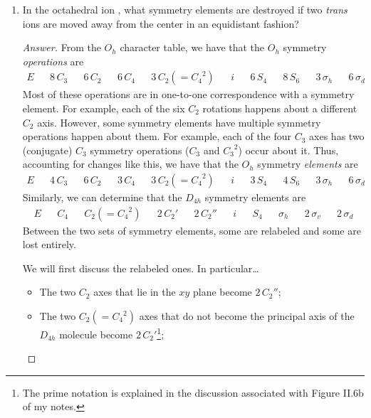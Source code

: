 \documentclass[../psets.tex]{subfiles}
\begin{document}
\begin{enumerate}[label={\Roman*)}]
\begin{enumerate}[label={\alph*)}]
\begin{proof}[Answer]
        \end{proof}
    \end{enumerate}
    \newpage
    \item In the octahedral ion , what symmetry elements are destroyed if two \emph{trans}  ions are moved away from the  center in an equidistant fashion?
    \begin{proof}[Answer]
        From the $O_h$ character table, we have that the $O_h$ symmetry \emph{operations} are
        \begin{align*}
            E&&
            8\,C_3&&
            6\,C_2&&
            6\,C_4&&
            3\,C_2(={C_4}^2)&&
            i&&
            6\,S_4&&
            8\,S_6&&
            3\,\sigma_h&&
            6\,\sigma_d
        \end{align*}
        Most of these operations are in one-to-one correspondence with a symmetry element. For example, each of the six $C_2$ rotations happens about a different $C_2$ axis. However, some symmetry elements have multiple symmetry operations happen about them. For example, each of the four $C_3$ axes has two (conjugate) $C_3$ symmetry operations ($C_3$ and ${C_3}^2$) occur about it. Thus, accounting for changes like this, we have that the $O_h$ symmetry \emph{elements} are
        \begin{align*}
            E&&
            4\,C_3&&
            6\,C_2&&
            3\,C_4&&
            3\,C_2(={C_4}^2)&&
            i&&
            3\,S_4&&
            4\,S_6&&
            3\,\sigma_h&&
            6\,\sigma_d
        \end{align*}
        Similarly, we can determine that the $D_{4h}$ symmetry elements are
        \begin{align*}
            E&&
            C_4&&
            C_2(={C_4}^2)&&
            2\,C_2'&&
            2\,C_2''&&
            i&&
            S_4&&
            \sigma_h&&
            2\,\sigma_v&&
            2\,\sigma_d
        \end{align*}
        Between the two sets of symmetry elements, some are relabeled and some are lost entirely.\par
        We will first discuss the relabeled ones. In particular\dots
        \begin{itemize}
            \item The two $C_2$ axes that lie in the $xy$ plane become $2\,C_2''$;
            \item The two $C_2(={C_4}^2)$ axes that do not become the principal axis of the $D_{4h}$ molecule become $2\,C_2'$\footnote{The prime notation is explained in the discussion associated with Figure II.6b of my notes.};

\end{itemize}
\end{proof}
\end{enumerate}
\end{document}
